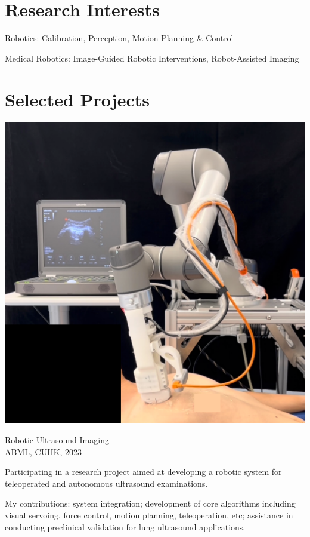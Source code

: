 \documentclass[11pt,letterpaper]{report}
\newcommand{\listitemspace}{0.25em}
\renewenvironment{itemize}
{\begin{list}{}{\setlength{\leftmargin}{0em}
			\setlength{\parskip}{0em}
			\setlength{\itemsep}{\listitemspace}
			\setlength{\parsep}{\listitemspace}}}
	{\end{list}}
\begin{document}
\section*{Research Interests}
\begin{itemize}
	\item Robotics: Calibration, Perception, Motion Planning \& Control
	\item Medical Robotics: Image-Guided Robotic Interventions, Robot-Assisted Imaging
\end{itemize}

\section*{Selected Projects}
\includegraphics[width=0.22\linewidth, valign=T]{img/usrobot}\hfill
\begin{minipage}[t]{0.75\linewidth}
	\vspace{0pt}\par
\begin{itemize}
	\item Robotic Ultrasound Imaging\\ABML, CUHK, 2023--
	\item Participating in a research project aimed at developing a robotic system for teleoperated and autonomous ultrasound examinations.
	\item My contributions: system integration; development of core algorithms including visual servoing, force control, motion planning, teleoperation, etc; assistance in conducting preclinical validation for lung ultrasound applications.
\end{itemize}
\end{minipage}\\~\\
\end{document}
